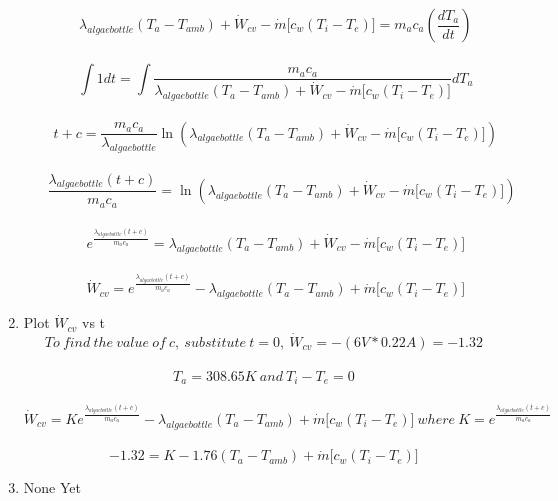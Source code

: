 \documentclass[12pt,a4paper]{article}
\begin{document}
\begin{enumerate}[label=\Alph*]
\begin{enumerate}
    		$$\lambda_{algaebottle} \left( T_a - T_{amb} \right) + \dot{W}_{cv} - \dot{m} \lbrack c_w \left( T_i - T_e \right) \rbrack = m_a c_a \left( \frac{dT_a}{dt} \right)$$ \\
    		$$\int 1 dt = \int \frac{m_a c_a}{\lambda_{algaebottle} \left( T_a - T_{amb} \right) + \dot{W}_{cv} - \dot{m} \lbrack c_w \left( T_i - T_e \right) \rbrack} dT_a$$ \\
    		$$t+ c = \frac{m_a c_a}{\lambda_{algaebottle}} \ln(\lambda_{algaebottle} \left( T_a - T_{amb} \right) + \dot{W}_{cv} - \dot{m} \lbrack c_w \left( T_i - T_e \right) \rbrack)$$ \\
    		$$\frac{\lambda_{algaebottle} \left( t + c \right)}{m_a c_a} = \ln(\lambda_{algaebottle} \left( T_a - T_{amb} \right) + \dot{W}_{cv} - \dot{m} \lbrack c_w \left( T_i - T_e \right) \rbrack)$$ \\
    		$$e^{\frac{\lambda_{algaebottle} \left( t + c \right)}{m_a c_a}} = \lambda_{algaebottle} \left( T_a - T_{amb} \right) + \dot{W}_{cv} - \dot{m} \lbrack c_w \left( T_i - T_e \right) \rbrack$$ \\
    		$$\dot{W}_{cv} = e^{\frac{\lambda_{algaebottle} \left( t + c \right)}{m_a c_a}} - \lambda_{algaebottle} \left( T_a - T_{amb} \right) + \dot{m} \lbrack c_w \left( T_i - T_e \right) \rbrack$$
    	\end{enumerate}
    \item Plot $\dot{W}_{cv}$ vs t \\
    $$To \ find \ the \ value \ of \ c, \ substitute \ t = 0, \ \dot{W}_{cv} = - \left( 6V * 0.22A \right) = -1.32$$ \\
    $$T_a = 308.65K \ and \ T_i - T_e = 0$$ \\
    $$\dot{W}_{cv} = K e^{\frac{\lambda_{algaebottle} \left( t + c \right)}{m_a c_a}} - \lambda_{algaebottle} \left( T_a - T_{amb} \right) + \dot{m} \lbrack c_w \left( T_i - T_e \right) \rbrack \ where \ K = e^{\frac{\lambda_{algaebottle} \left( t + c \right)}{m_a c_a}}$$ \\
    $$-1.32 = K - 1.76 \left( T_a - T_{amb} \right) + \dot{m} \lbrack c_w \left( T_i - T_e \right) \rbrack$$
    \item None Yet
    \end{enumerate}
\end{document}
